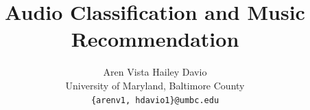 \documentclass[10pt,twocolumn,letterpaper]{article}
\title{Audio Classification and Music Recommendation}
\author{Aren Vista \quad Hailey Davio\\
University of Maryland, Baltimore County\\
{\tt\small \{arenv1, hdavio1\}@umbc.edu}
}
\begin{document}
\maketitle
    






\nocite{*}
{
    \small
    
    
}

% 
\end{document}
